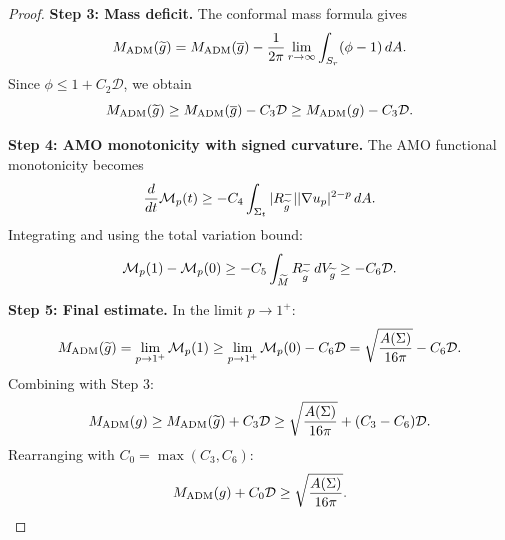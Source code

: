\begin{proof}
\textbf{Step 3: Mass deficit.}
The conformal mass formula gives
\begin{equation}
    M_{\mathrm{ADM}}(\widetilde{g}) = M_{\mathrm{ADM}}(\overline{g}) - \frac{1}{2\pi} \lim_{r \to \infty} \int_{S_r} (\phi - 1) \, dA.
\end{equation}
Since $\phi \le 1 + C_2 \mathcal{D}$, we obtain
\begin{equation}
    M_{\mathrm{ADM}}(\widetilde{g}) \ge M_{\mathrm{ADM}}(\overline{g}) - C_3 \mathcal{D} \ge M_{\mathrm{ADM}}(g) - C_3 \mathcal{D}.
\end{equation}

\textbf{Step 4: AMO monotonicity with signed curvature.}
The AMO functional monotonicity becomes
\begin{equation}
    \frac{d}{dt} \mathcal{M}_p(t) \ge -C_4 \int_{\Sigma_t} |R_{\widetilde{g}}^-| |\nabla u_p|^{2-p} \, dA.
\end{equation}
Integrating and using the total variation bound:
\begin{equation}
    \mathcal{M}_p(1) - \mathcal{M}_p(0) \ge -C_5 \int_{\widetilde{M}} R_{\widetilde{g}}^- \, dV_{\widetilde{g}} \ge -C_6 \mathcal{D}.
\end{equation}

\textbf{Step 5: Final estimate.}
In the limit $p \to 1^+$:
\begin{equation}
    M_{\mathrm{ADM}}(\widetilde{g}) = \lim_{p \to 1^+} \mathcal{M}_p(1) \ge \lim_{p \to 1^+} \mathcal{M}_p(0) - C_6 \mathcal{D} = \sqrt{\frac{A(\Sigma)}{16\pi}} - C_6 \mathcal{D}.
\end{equation}
Combining with Step 3:
\begin{equation}
    M_{\mathrm{ADM}}(g) \ge M_{\mathrm{ADM}}(\widetilde{g}) + C_3 \mathcal{D} \ge \sqrt{\frac{A(\Sigma)}{16\pi}} + (C_3 - C_6) \mathcal{D}.
\end{equation}
Rearranging with $C_0 = \max(C_3, C_6)$:
\begin{equation}
    M_{\mathrm{ADM}}(g) + C_0 \mathcal{D} \ge \sqrt{\frac{A(\Sigma)}{16\pi}}.
\end{equation}
\end{proof}

